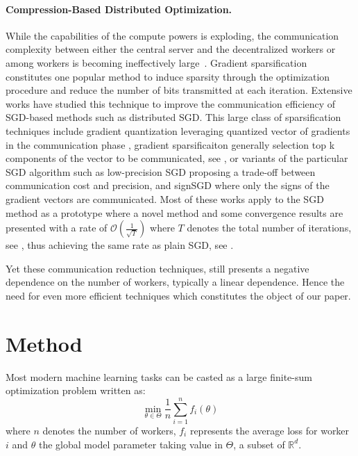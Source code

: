 \documentclass[11pt]{article}
\begin{document}
\paragraph{Compression-Based Distributed Optimization. }
While the capabilities of the compute powers is exploding, the communication complexity between either the central server and the decentralized workers or among workers is becoming ineffectively large~\citep{chilimbi2014project, mcmahan2017communication}. 
Gradient sparsification constitutes one popular method to induce sparsity through the optimization procedure and reduce the number of bits transmitted at each iteration.
Extensive works have studied this technique to improve the communication efficiency of SGD-based methods such as distributed SGD.
This large class of sparsification techniques include gradient quantization leveraging quantized vector of gradients in the communication phase \citep{alistarh2017qsgd,wen2017terngrad,jiang2018linear,wangni2017gradient,haddadpour2019trading,chen2010approximate,jegou2010product}, gradient sparsificaiton generally selection top k components of the vector to be communicated, see \citep{stich2018sparsified,aji2017sparse}, or variants of the particular SGD algorithm such as low-precision SGD \citep{bernstein2018signsgd,karimireddy2019error} proposing a trade-off between communication cost and precision, and signSGD \citep{de2017understanding,yang2019swalp} where only the signs of the gradient vectors are communicated.
Most of these works apply to the SGD method \citep{bottou2008} as a prototype where a novel method and some convergence results are presented with a rate of $\mathcal{O}(\frac{1}{\sqrt{T}})$ where $T$ denotes the total number of iterations, see \citep{alistarh2018convergence}, thus achieving the same rate as plain SGD, see \citep{ghadimi2013stochastic,karimi2019non}.

Yet these communication reduction techniques, still presents a negative dependence on the number of workers, typically a linear dependence.
Hence the need for even more efficient techniques which constitutes the object of our paper.




\section{Method}\label{sec:main}

Most modern machine learning tasks can be casted as a large finite-sum optimization problem written as:
\begin{equation}\label{eq:opt}
\min \limits_{\theta \in \Theta} \frac{1}{n} \sum_{i=1}^n f_i(\theta)
\end{equation}
where $n$ denotes the number of workers, $f_i$ represents the average loss for worker $i$ and $\theta$ the global model parameter taking value in $\Theta$, a subset of $\mathbb{R}^d$.
\end{document}
